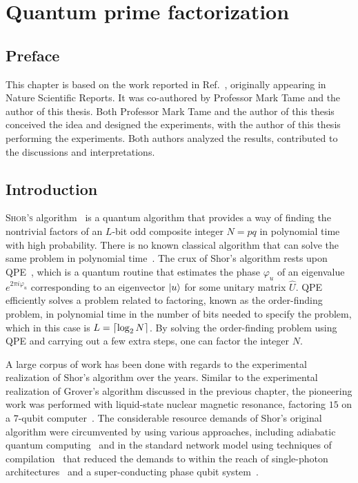 \chapter{Quantum prime factorization}

\section{Preface}

This chapter is based on the work reported in Ref.~\cite{Skosana_2021}, originally appearing in Nature Scientific Reports. It was co-authored by Professor Mark Tame and the author of this thesis. Both Professor Mark Tame and the author of this thesis conceived the idea and designed the experiments, with the author of this thesis performing the experiments. Both authors analyzed the results, contributed to the discussions and interpretations. 


\section{Introduction}

\lettrine[lines=3]{S}{hor's} algorithm~\cite{Shor_1997} is a quantum algorithm that provides a way of finding the nontrivial factors of an $L$-bit odd composite integer $N=pq$ in polynomial time with high probability. There is no known classical algorithm that can solve the same problem in polynomial time~\cite{Mike&Ike, Dewolf_2019}. The crux of Shor's algorithm rests upon \gls{QPE}~\cite{Mike&Ike}, which is a quantum routine that estimates the phase $\varphi_u$ of an eigenvalue $e^{2\pi i \varphi_u}$ corresponding to an eigenvector $\ket{u}$ for some unitary matrix $\hat{U}$. \acs{QPE} efficiently solves a problem related to factoring, known as the order-finding problem, in polynomial time in the number of bits needed to specify the problem, which in this case is $L=\lceil\log_{2}{N}\rceil$. By solving the order-finding problem using \acs{QPE} and carrying out a few extra steps, one can factor the integer $N$. 

\bigskip
\noindent
A large corpus of work has been done with regards to the experimental realization of Shor's algorithm over the years. Similar to the experimental realization of Grover's algorithm discussed in the previous chapter, the pioneering work was performed with liquid-state nuclear magnetic resonance, factoring $15$ on a $7$-qubit computer~\cite{Vandersypen_2001}. The considerable resource demands of Shor's original algorithm were circumvented by using various approaches, including adiabatic quantum computing~\cite{Peng_2008} and in the standard network model using techniques of compilation~\cite{Vidal_2003a} that reduced the demands to within the reach of single-photon architectures~\cite{Lu_2007, Lanyon_2007, Politi_2009} and a super-conducting phase qubit system~\cite{Lucero_2012}. 

